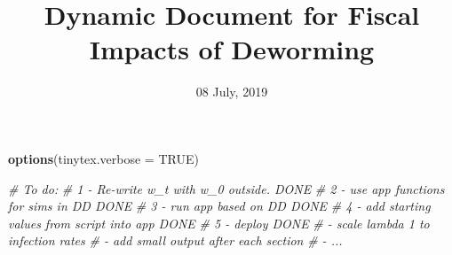 \documentclass[]{article}
\title{Dynamic Document for Fiscal Impacts of Deworming}
\author{}
\date{08 July, 2019}
\newenvironment{Shaded}{\begin{snugshade}}{\end{snugshade}}
\newcommand{\CommentTok}[1]{\textcolor[rgb]{0.56,0.35,0.01}{\textit{#1}}}
\newcommand{\DataTypeTok}[1]{\textcolor[rgb]{0.13,0.29,0.53}{#1}}
\newcommand{\KeywordTok}[1]{\textcolor[rgb]{0.13,0.29,0.53}{\textbf{#1}}}
\newcommand{\NormalTok}[1]{#1}
\newcommand{\OtherTok}[1]{\textcolor[rgb]{0.56,0.35,0.01}{#1}}
\begin{document}
\maketitle

\def\blue{\color{blue}}

\begin{Shaded}
\begin{Highlighting}[]
\KeywordTok{options}\NormalTok{(}\DataTypeTok{tinytex.verbose =} \OtherTok{TRUE}\NormalTok{)}
\end{Highlighting}
\end{Shaded}

\begin{Shaded}
\begin{Highlighting}[]
\CommentTok{# To do:}
\CommentTok{# 1 - Re-write w_t with w_0 outside.                DONE}
\CommentTok{# 2 - use app functions for sims in DD              DONE }
\CommentTok{# 3 - run app based on DD                           DONE}
\CommentTok{# 4 - add starting values from script into app      DONE}
\CommentTok{# 5 - deploy                                        DONE}
\CommentTok{# - scale lambda 1 to infection rates}
\CommentTok{# - add small output after each section}
\CommentTok{# - ...}


\end{Highlighting}
\end{Shaded}
\end{document}
